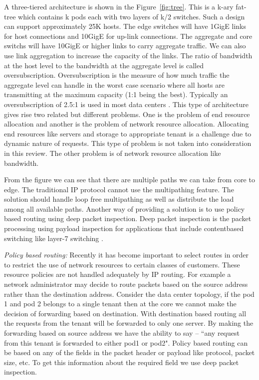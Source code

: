 \documentclass[11pt,letterpaper,onecolumn]{article}
\begin{document}
\par{A three-tiered architecture is shown in the Figure~\ref{fig:tree}. This is a k-ary fat-tree which contains k pods each with two layers of k/2 switches. Such a design can support approximately 25K hosts. The edge switches will have 1GigE links for host connections and 10GigE for up-link connections. The aggregate and core switchs will have 10GigE or higher links to carry aggregate traffic. We can also use link aggregation to increase the capacity of the links. The ratio of bandwidth at the host level to the bandwidth at the aggregate level is called oversubscription. Oversubscription is the measure of how much traffic the aggregate level can handle in the worst case scenario where all hosts are transmitting at the maximum capacity (1:1 being the best). Typically an oversubscription of 2.5:1 is used in most data centers \cite{al2008scalable}. This type of architecture gives rise two related but different problems. One is the problem of end resource allocation and another is the problem of network resource allocation. Allocating end resources like servers and storage to appropriate tenant is a challenge due to dynamic nature of requests. This type of problem is not taken into consideration in this review. The other problem is of network resource allocation like bandwidth.}\\

\par{From the figure we can see that there are multiple paths we can take from core to edge. The traditional IP protocol cannot use the multipathing feature. The solution should handle loop free multipathing as well as distribute the load among all available paths. Another way of providing a solution is to use policy based routing using deep packet inspection. Deep packet inspection is the packet processing using payload inspection for applications that include contentbased switching like layer-7 switching \cite{dharmapurikar2003deep} \cite{porter2005perils}.}\\

\par{\textit{Policy based routing:} Recently it has become important to select routes in order to restrict the use of network resources to certain classes of customers. These resource policies are not handled adequately by IP routing. For example a network administrator may decide to route packets based on the source address rather than the destination address. Consider the data center topology, if the pod 1 and pod 2 belongs to a single tenant then at the core we cannot make the decision of forwarding based on destination. With destination based routing all the requests from the tenant will be forwarded to only one server. By making the forwarding based on source address we have the ability to say -- ``any request from this tenant is forwarded to either pod1 or pod2". Policy based routing can be based on any of the fields in the packet header or payload like protocol, packet size, etc. To get this information about the required field we use deep packet inspection\cite{wiki:002}. }\\
\end{document}
